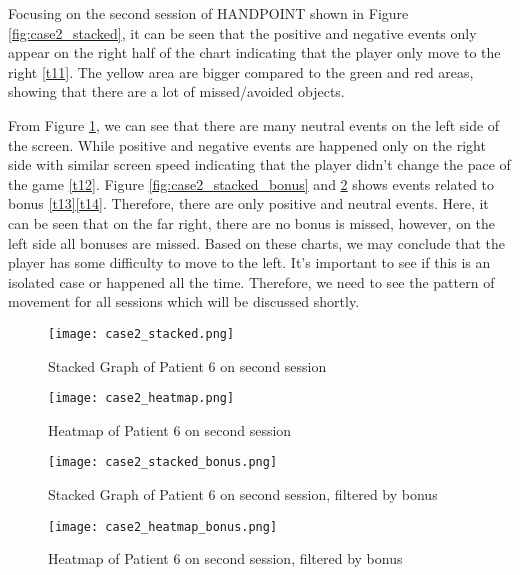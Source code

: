 Focusing on the second session of HANDPOINT shown in Figure \ref{fig:case2_stacked}, it can be seen that the positive and negative events only appear on the right half of the chart indicating that the player only move to the right \ref{t11}. The yellow area are bigger compared to the green and red areas, showing that there are a lot of missed/avoided objects. 

From Figure \ref{fig:case2_heatmap}, we can see that there are many neutral events on the left side of the screen. While positive and negative events are happened only on the right side with similar screen speed indicating that the player didn't change the pace of the game \ref{t12}. Figure \ref{fig:case2_stacked_bonus} and \ref{fig:case2_heatmap_bonus} shows events related to bonus \ref{t13}\ref{t14}. Therefore, there are only positive and neutral events. Here, it can be seen that on the far right, there are no bonus is missed, however, on the left side all bonuses are missed. Based on these charts, we may conclude that the player has some difficulty to move to the left. It's important to see if this is an isolated case or happened all the time. Therefore, we need to see the pattern of movement for all sessions which will be discussed shortly.
\begin{figure}[H]
\centering
\texttt{[image: case2\_stacked.png]}
\caption{Stacked Graph of Patient 6 on second session}
\label{fig:case2_stacked}
\vspace{1cm}
\texttt{[image: case2\_heatmap.png]}
\caption{Heatmap of Patient 6 on second session}
\label{fig:case2_heatmap}
\end{figure}

\begin{figure}[H]
\centering
\texttt{[image: case2\_stacked\_bonus.png]}
\caption{Stacked Graph of Patient 6 on second session, filtered by bonus}
\label{fig:case2_stacked_bonus}
\vspace{1cm}
\texttt{[image: case2\_heatmap\_bonus.png]}
\caption{Heatmap of Patient 6 on second session, filtered by bonus}
\label{fig:case2_heatmap_bonus}
\end{figure}

